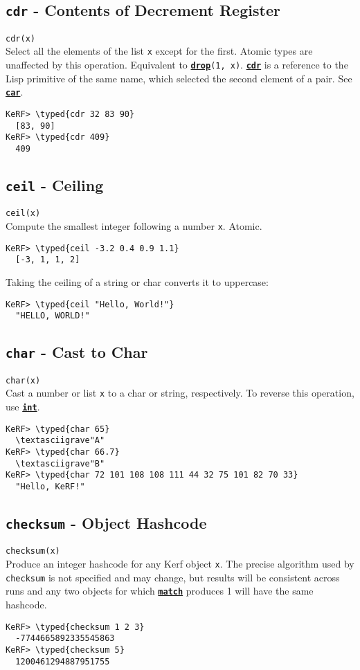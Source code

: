 \documentclass{article}
\newcommand{\typed}[1]{\textcolor{TealBlue}{#1}}
\newcommand{\primdefu}[3]{\subsection{\texttt{#1} - #2}\label{prim:#3}}
\newcommand{\primu}[2]{\hyperref[prim:#2]{\textbf{\texttt{#1}}}}
\newcommand{\primdef}[2]{\primdefu{#1}{#2}{#1}}
\newcommand{\prim}[1]{\primu{#1}{#1}}
\begin{document}
\primdef{cdr}{Contents of Decrement Register}
\texttt{cdr(x)}\\

Select all the elements of the list \texttt{x} except for the first. Atomic types are unaffected by this operation. Equivalent to \prim{drop}\texttt{(1, x)}. \prim{cdr} is a reference to the Lisp primitive of the same name, which selected the second element of a pair. See \prim{car}.

\begin{Verbatim}
KeRF> \typed{cdr 32 83 90}
  [83, 90]
KeRF> \typed{cdr 409}
  409
\end{Verbatim}

\primdef{ceil}{Ceiling}
\texttt{ceil(x)}\\

Compute the smallest integer following a number \texttt{x}. Atomic.
\begin{Verbatim}
KeRF> \typed{ceil -3.2 0.4 0.9 1.1}
  [-3, 1, 1, 2]
\end{Verbatim}

Taking the ceiling of a string or char converts it to uppercase:
\begin{Verbatim}
KeRF> \typed{ceil "Hello, World!"}
  "HELLO, WORLD!"
\end{Verbatim}

\primdef{char}{Cast to Char}
\texttt{char(x)}\\

Cast a number or list \texttt{x} to a char or string, respectively. To reverse this operation, use \prim{int}.
\begin{Verbatim}
KeRF> \typed{char 65}
  \textasciigrave"A"
KeRF> \typed{char 66.7}
  \textasciigrave"B"
KeRF> \typed{char 72 101 108 108 111 44 32 75 101 82 70 33}
  "Hello, KeRF!"
\end{Verbatim}

\primdef{checksum}{Object Hashcode}
\texttt{checksum(x)}\\

Produce an integer hashcode for any Kerf object \texttt{x}. The precise algorithm used by \texttt{checksum} is not specified and may change, but results will be consistent across runs and any two objects for which \prim{match} produces 1 will have the same hashcode.

\begin{Verbatim}
KeRF> \typed{checksum 1 2 3}
  -7744665892335545863
KeRF> \typed{checksum 5}
  1200461294887951755
\end{Verbatim}
\end{document}
